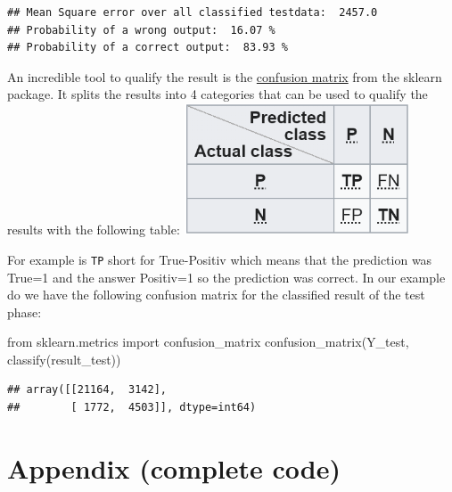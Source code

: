 \documentclass[
]{book}
\newenvironment{Shaded}{\begin{snugshade}}{\end{snugshade}}
\newcommand{\ImportTok}[1]{#1}
\newcommand{\NormalTok}[1]{#1}
\begin{document}
\begin{verbatim}
## Mean Square error over all classified testdata:  2457.0
## Probability of a wrong output:  16.07 %
## Probability of a correct output:  83.93 %
\end{verbatim}

An incredible tool to qualify the result is the \href{https://en.wikipedia.org/wiki/Confusion_matrix}{confusion matrix} from the sklearn package. It splits the results into 4 categories that can be used to qualify the results with the following table:
\includegraphics[width=0.5\textwidth,height=\textheight]{./img/confusion_matrix.png}

For example is \texttt{TP} short for True-Positiv which means that the prediction was True=1 and the answer Positiv=1 so the prediction was correct. In our example do we have the following confusion matrix for the classified result of the test phase:

\begin{Shaded}
\begin{Highlighting}[]
\ImportTok{from}\NormalTok{ sklearn.metrics }\ImportTok{import}\NormalTok{ confusion\_matrix}
\NormalTok{confusion\_matrix(Y\_test, classify(result\_test))}
\end{Highlighting}
\end{Shaded}

\begin{verbatim}
## array([[21164,  3142],
##        [ 1772,  4503]], dtype=int64)
\end{verbatim}

\hypertarget{appendix-complete-code-3}{%
\section{Appendix (complete code)}\label{appendix-complete-code-3}}
\end{document}
